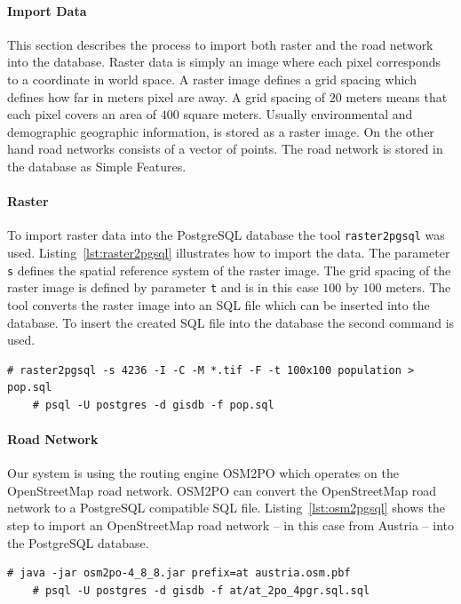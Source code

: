 \paragraph{Import Data}
This section describes the process to import both raster and the road network into the database. Raster data is simply an image where each pixel corresponds to a coordinate in world space. A raster image defines a grid spacing which defines how far in meters pixel are away. A grid spacing of $20$ meters means that each pixel covers an area of $400$ square meters. Usually environmental and demographic geographic information, is stored as a raster image. On the other hand road networks consists of a vector of points. The road network is stored in the database as Simple Features.

\paragraph{Raster}
To import raster data into the PostgreSQL database the tool \verb|raster2pgsql| was used. Listing~\ref{lst:raster2pgsql} illustrates how to import the data. The parameter \verb|s| defines the spatial reference system of the raster image. The grid spacing of the raster image is defined by parameter \verb|t| and is in this case $100$ by $100$ meters. The tool converts the raster image into an SQL file which can be inserted into the database. To insert the created SQL file into the database the second command is used.
\begin{lstlisting}[style=BashInputStyle,caption={Import raster data into PostgreSQL database},label={lst:raster2pgsql}]
    # raster2pgsql -s 4236 -I -C -M *.tif -F -t 100x100 population > pop.sql
    # psql -U postgres -d gisdb -f pop.sql
\end{lstlisting}
\paragraph{Road Network}
Our system is using the routing engine OSM2PO which operates on the OpenStreetMap road network. OSM2PO can convert the OpenStreetMap road network to a PostgreSQL compatible SQL file. Listing~\ref{lst:osm2pgsql} shows the step to import an OpenStreetMap road network -- in this case from Austria -- into the PostgreSQL  database.
\begin{lstlisting}[style=BashInputStyle,caption={Import OpenStreetmap data into PostgreSQL database},label={lst:osm2pgsql}]
    # java -jar osm2po-4_8_8.jar prefix=at austria.osm.pbf
    # psql -U postgres -d gisdb -f at/at_2po_4pgr.sql.sql
\end{lstlisting}
